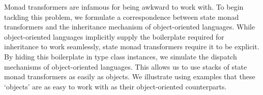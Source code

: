 


Monad transformers are infamous for being awkward to work with. To begin tackling this problem, we formulate a correspondence between state monad transformers and the inheritance mechanism of object-oriented languages. While object-oriented languages implicitly supply the boilerplate required for inheritance to work seamlessly, state monad transformers require it to be explicit. By hiding this boilerplate in type class instances, we simulate the dispatch mechanisms of object-oriented languages. This allows us to use stacks of state monad transformers as easily as objects. We illustrate using examples that these `objects' are as easy to work with as their object-oriented counterparts.

